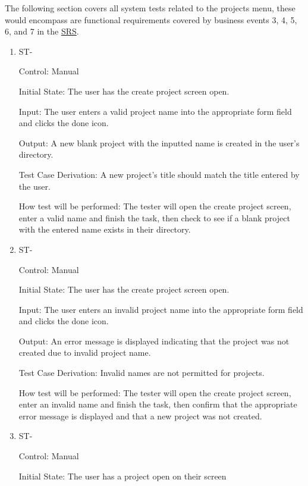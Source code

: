 \documentclass[12pt, titlepage]{article}
\newcounter{TESTID}
\newcommand\TESTNUM{\stepcounter{TESTID}\theTESTID}
\begin{document}
	The following section covers all system tests related to the projects menu, these would encompass are functional requirements covered by business events 3, 4, 5, 6, and 7 in the \href{https://github.com/RutheniumVI/UnderTree/blob/main/docs/SRS/SRS.pdf}{SRS}.
	
	\begin{enumerate}
		
		\item{ST-\TESTNUM\\}
		
		Control: Manual
		
		Initial State: The user has the create project screen open.
		
		Input: The user enters a valid project name into the appropriate form field and clicks the done icon.
		
		Output: A new blank project with the inputted  name is created in the user's directory. 
		
		Test Case Derivation: A new project's title should match the title entered by the user.
		
		How test will be performed: The tester will open the create project screen, enter a valid name and finish the task, then check to see if a blank project with the entered name exists in their directory.
		
		\item{ST-\TESTNUM\\}
		
		Control: Manual
		
		Initial State: The user has the create project screen open.
		
		Input: The user enters an invalid project name into the appropriate form field and clicks the done icon.
		
		Output: An error message is displayed indicating that the project was not created due to invalid project name. 
		
		Test Case Derivation: Invalid names are not permitted for projects.
		
		How test will be performed: The tester will open the create project screen, enter an invalid name and finish the task, then confirm that the appropriate error message is displayed and that a new project was not created.
		
		\item{ST-\TESTNUM\\}
		
		Control: Manual
		
		Initial State: The user has a project open on their screen
		

\end{enumerate}
\end{document}
